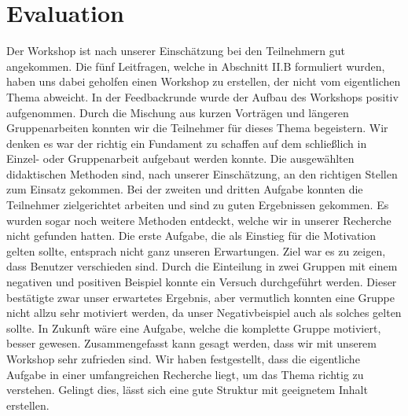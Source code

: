 \section{Evaluation}
Der Workshop ist nach unserer Einschätzung bei den Teilnehmern gut angekommen. Die fünf Leitfragen, welche in Abschnitt II.B formuliert wurden, haben uns dabei geholfen einen Workshop zu erstellen, der nicht vom eigentlichen Thema abweicht. 
In der Feedbackrunde wurde der Aufbau des Workshops positiv aufgenommen. Durch die Mischung aus kurzen Vorträgen und längeren Gruppenarbeiten konnten wir die Teilnehmer für dieses Thema begeistern. Wir denken es war der richtig ein Fundament zu schaffen auf dem schließlich in Einzel- oder Gruppenarbeit aufgebaut werden konnte. 
Die ausgewählten didaktischen Methoden sind, nach unserer Einschätzung, an den richtigen Stellen zum Einsatz gekommen. Bei der zweiten und dritten Aufgabe konnten die Teilnehmer zielgerichtet arbeiten und sind zu guten Ergebnissen gekommen. Es wurden sogar noch weitere Methoden entdeckt, welche wir in unserer Recherche nicht gefunden hatten.  Die erste Aufgabe, die als Einstieg für die Motivation gelten sollte, entsprach nicht ganz unseren Erwartungen. Ziel war es zu zeigen, dass Benutzer verschieden sind. Durch die Einteilung in zwei Gruppen mit einem negativen und positiven Beispiel konnte ein Versuch durchgeführt werden. Dieser bestätigte zwar unser erwartetes Ergebnis, aber vermutlich konnten eine Gruppe nicht allzu sehr motiviert werden, da unser Negativbeispiel auch als solches gelten sollte. In Zukunft wäre eine Aufgabe, welche die komplette Gruppe motiviert, besser gewesen. 
Zusammengefasst kann gesagt werden, dass wir mit unserem Workshop sehr zufrieden sind. Wir haben festgestellt, dass die eigentliche Aufgabe in einer umfangreichen Recherche liegt, um das Thema richtig zu verstehen. Gelingt dies, lässt sich eine gute Struktur mit geeignetem Inhalt erstellen.
  